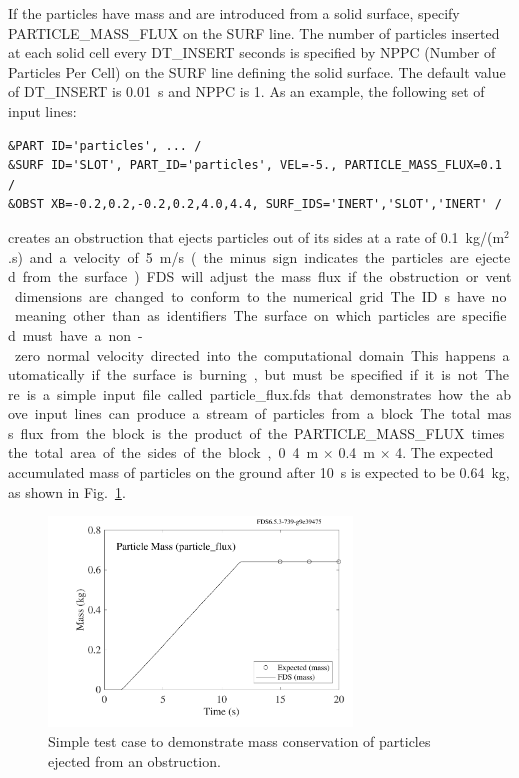 \documentclass[11pt]{book}
\begin{document}
If the particles have mass and are introduced from a solid surface, specify {\ct PARTICLE\_MASS\_FLUX} on the {\ct SURF} line. The number of particles inserted at each solid cell every
{\ct DT\_INSERT} seconds is specified by {\ct NPPC} (Number of Particles Per Cell) on the {\ct SURF} line defining the solid surface. The default value of {\ct DT\_INSERT} is 0.01~s and {\ct NPPC} is 1. As an example, the following set of input lines:
\begin{lstlisting}
&PART ID='particles', ... /
&SURF ID='SLOT', PART_ID='particles', VEL=-5., PARTICLE_MASS_FLUX=0.1 /
&OBST XB=-0.2,0.2,-0.2,0.2,4.0,4.4, SURF_IDS='INERT','SLOT','INERT' /
\end{lstlisting}
creates an obstruction that ejects particles out of its sides at a rate
of 0.1~\si{kg/(m$^2$.s)} and a velocity of 5~m/s (the minus sign indicates the particles are ejected from the surface).
FDS will adjust the mass flux if the obstruction or vent dimensions are changed to conform to the numerical grid. The
{\ct ID}s have no meaning other than as identifiers. The surface on which particles are specified must have a non-zero normal velocity directed into the
computational domain. This happens automatically if the surface is burning, but must be specified
if it is not. There is a simple input file called {\ct particle\_flux.fds} that demonstrates how the above input lines can produce a stream of
particles from a block. The total mass flux from the block is the product of the {\ct PARTICLE\_MASS\_FLUX} times the total area of the sides of the block,
0.4~m $\times$ 0.4~m $\times$ 4. The expected accumulated mass of particles on the ground after 10~s is expected to be 0.64~kg, as shown in Fig.~\ref{particle_flux}.

\begin{figure}[ht]
\begin{center}
\includegraphics[height=2.2in]{SCRIPT_FIGURES/particle_flux}
\end{center}
\caption[Results of the {\ct particle\_flux} test case]{Simple test case to demonstrate mass conservation of particles ejected from an obstruction.}
\label{particle_flux}
\end{figure}
\end{document}
